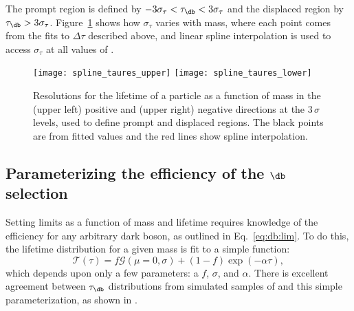 The prompt region is defined by $-3\sigma_\tau<\tau_{\db}<3\sigma_\tau$ and the displaced region
by $\tau_{\db}>3\sigma_\tau$.
Figure~\ref{fig:eff:res} shows how $\sigma_\tau$ varies with mass, where each point comes from the
fits to $\Delta\tau$ described above, and linear spline interpolation is used to access
$\sigma_\tau$ at all values of .



\begin{figure}
  \begin{center}
    \texttt{[image: spline\_taures\_upper]}
    \texttt{[image: spline\_taures\_lower]}\\
    \caption[Parameterization of lifetime resolution as a function of \db mass]
    {
      Resolutions for the lifetime of a particle as a function of mass in the
      (upper left) positive and
      (upper right) negative directions at the $3\,\sigma$ levels, used to
      define prompt and displaced regions.
      The black points are from fitted values and the red lines show spline interpolation.
    }
    \label{fig:eff:res}
  \end{center}
\end{figure}



\subsection[Parameterizing the efficiency of the \db selection]
{Parameterizing the efficiency of the $\boldsymbol{\db}$ selection}
Setting limits as a function of mass and lifetime requires knowledge of the efficiency for any arbitrary
dark boson, as outlined in Eq.~\ref{eq:db:lim}.
To do this, the lifetime distribution for a given mass is fit to a simple function:
\begin{equation}
  \mathcal{T}(\tau) = f\mathcal{G}(\mu=0, \sigma) + (1-f)\exp\left(-\alpha\tau\right),
  \label{eq:eff:parameters}
\end{equation}
which depends upon only a few parameters: a $f$, $\sigma$, and $\alpha$.
There is excellent agreement between $\tau_\db$ distributions from simulated samples of \btokstrdb
and this simple parameterization, as shown in .

